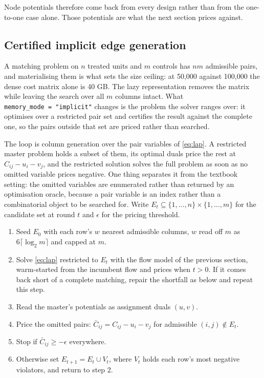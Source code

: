 Node potentials therefore come back from every design rather than from the
one-to-one case alone. Those potentials are what the next section prices
against.

\subsection{Certified implicit edge generation}\label{certified-implicit-edge-generation}

A matching problem on \(n\) treated units and \(m\) controls has \(nm\) admissible
pairs, and materialising them is what sets the size ceiling: at 50,000 against
100,000 the dense cost matrix alone is 40 GB. The lazy representation removes
the matrix while leaving the search over all \(m\) columns intact. What
\texttt{memory\_mode\ =\ "implicit"} changes is the problem the solver ranges over: it
optimises over a restricted pair set and certifies the result against the
complete one, so the pairs outside that set are priced rather than searched.

The loop is column generation \citep{LubbeckeDesrosiers2005} over the pair variables
of \eqref{eq:lap}. A restricted master problem holds a subset of them, its
optimal duals price the rest at \(C_{ij} - u_i - v_j\), and the restricted
solution solves the full problem as soon as no omitted variable prices negative.
One thing separates it from the textbook setting: the omitted variables are
enumerated rather than returned by an optimisation oracle, because a pair
variable is an index rather than a combinatorial object to be searched for.
Write
\(E_t \subseteq \{1, \dots, n\} \times \{1, \dots, m\}\) for the candidate set at
round \(t\) and \(\epsilon\) for the pricing threshold.

\begin{enumerate}
\def\labelenumi{\arabic{enumi}.}
\tightlist
\item
  Seed \(E_0\) with each row's \(w\) nearest admissible columns, \(w\) read off \(m\)
  as \(6\lceil \log_2 m\rceil\) and capped at \(m\).
\item
  Solve \eqref{eq:lap} restricted to \(E_t\) with the flow model of the previous
  section, warm-started from the incumbent flow and prices when \(t > 0\). If it
  comes back short of a complete matching, repair the shortfall as below and
  repeat this step.
\item
  Read the master's potentials as assignment duals \((u, v)\).
\item
  Price the omitted pairs: \(\bar{C}_{ij} = C_{ij} - u_i - v_j\) for admissible
  \((i,j) \notin E_t\).
\item
  Stop if \(\bar{C}_{ij} \ge -\epsilon\) everywhere.
\item
  Otherwise set \(E_{t+1} = E_t \cup V_t\), where \(V_t\) holds each row's most
  negative violators, and return to step 2.
\end{enumerate}


